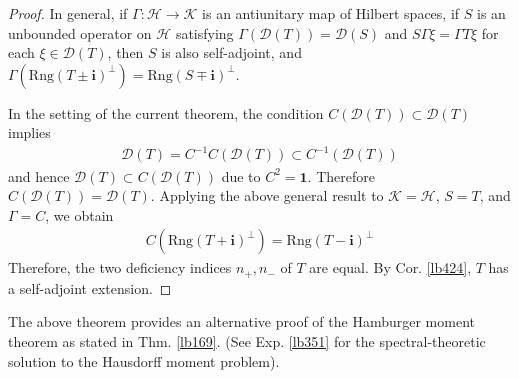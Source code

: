 \documentclass[12pt,b5paper,notitlepage]{article}
\theoremstyle{definition}
\theoremstyle{plain}
\newcommand{\idt}{\mathbf{1}}
\newcommand{\Dom}{\mathscr{D}}
\newcommand{\im}{\mathbf{i}}
\newcommand{\Rng}{\mathrm{Rng}}
\newcommand{\MH}{\mathcal H}
\newcommand{\MK}{\mathcal K}
\numberwithin{equation}{section}
\begin{document}
\begin{proof}
In general, if $\Gamma:\MH\rightarrow\MK$ is an antiunitary map of Hilbert spaces, if $S$ is an unbounded operator on $\MH$ satisfying  $\Gamma(\Dom(T))=\Dom(S)$ and $S\Gamma\xi=\Gamma T\xi$ for each $\xi\in\Dom(T)$, then $S$ is also self-adjoint, and $\Gamma(\Rng(T\pm\im)^\perp)=\Rng(S\mp\im)^\perp$.

In the setting of the current theorem, the condition $C(\Dom(T))\subset\Dom(T)$ implies
\begin{align*}
\Dom(T)=C^{-1}C(\Dom(T))\subset C^{-1}(\Dom(T))
\end{align*}
and hence $\Dom(T)\subset C(\Dom(T))$ due to $C^2=\idt$. Therefore $C(\Dom(T))=\Dom(T)$. Applying the above general result to $\MK=\MH$, $S=T$, and $\Gamma=C$, we obtain 
\begin{align*}
C(\Rng(T+\im)^\perp)=\Rng(T-\im)^\perp
\end{align*}
Therefore, the two deficiency indices $n_+,n_-$ of $T$ are equal. By Cor. \ref{lb424}, $T$ has a self-adjoint extension.
\end{proof}



The above theorem provides an alternative proof of the Hamburger moment theorem as stated in Thm. \ref{lb169}. (See Exp. \ref{lb351} for the spectral-theoretic solution to the Hausdorff moment problem).
\end{document}
